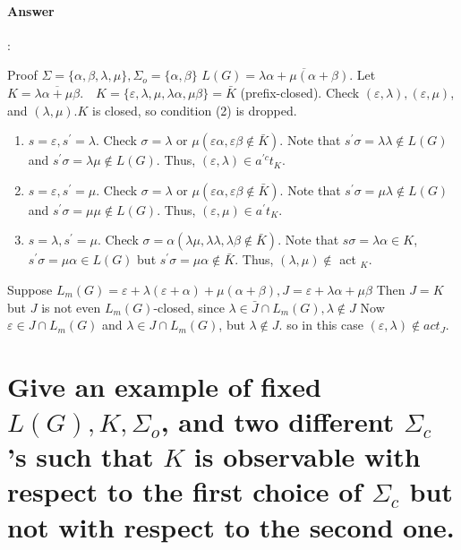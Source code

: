 \documentclass{article}
\begin{document}
\paragraph{Answer}:

Proof $\Sigma=\{\alpha, \beta, \lambda, \mu\}, \Sigma_o=\{\alpha, \beta\}$ $L(G)=\overline{\lambda \alpha+\mu(\alpha+\beta)}$. Let $K=\overline{\lambda \alpha+\mu \beta} . \quad K=\{\varepsilon, \lambda, \mu, \lambda \alpha, \mu \beta\}=\bar{K}$ (prefix-closed). Check $(\varepsilon, \lambda),(\varepsilon, \mu)$, and $(\lambda, \mu) . K$ is closed, so condition (2) is dropped.

\begin{enumerate}
  \item  $s=\varepsilon, s^{\prime}=\lambda$. Check $\sigma=\lambda$ or $\mu(\varepsilon \alpha, \varepsilon \beta \notin \bar{K})$. Note that $s^{\prime} \sigma=\lambda \lambda \notin L(G)$ and $s^{\prime} \sigma=\lambda \mu \notin L(G)$. Thus, $(\varepsilon, \lambda) \in a^{\prime c} t_K$.
  \item $s=\varepsilon, s^{\prime}=\mu$. Check $\sigma=\lambda$ or $\mu(\varepsilon \alpha, \varepsilon \beta \notin \bar{K})$. Note that $s^{\prime} \sigma=\mu \lambda \notin L(G)$ and $s^{\prime} \sigma=\mu \mu \notin L(G)$. Thus, $(\varepsilon, \mu) \in a^{\prime} t_K$.
  \item $s=\lambda, s^{\prime}=\mu$. Check $\sigma=\alpha(\lambda \mu, \lambda \lambda, \lambda \beta \notin \bar{K})$. Note that $s \sigma=\lambda \alpha \in K$, $s^{\prime} \sigma=\mu \alpha \in L(G)$ but $s^{\prime} \sigma=\mu \alpha \notin \bar{K}$. Thus, $(\lambda, \mu) \notin$ act ${ }_K$.
\end{enumerate}

Suppose $L_m(G)=\varepsilon+\lambda(\varepsilon+\alpha)+\mu(\alpha+\beta), J=\varepsilon+\lambda \alpha+\mu \beta$ Then $J=K$ but $J$ is not even $L_m(G)$-closed, since $\lambda \in \bar{J} \cap L_m(G), \lambda \notin J$ Now $\varepsilon \in J \cap L_m(G)$ and $\lambda \in J \cap L_m(G)$, but $\lambda \notin J$. so in this case $(\varepsilon, \lambda) \notin a c t_J$.

\section{Give an example of fixed $L(G), K, \Sigma_o$, and two different $\Sigma_c$ 's such that $K$ is observable with respect to the first choice of $\Sigma_c$ but not with respect to the second one.}
\end{document}
